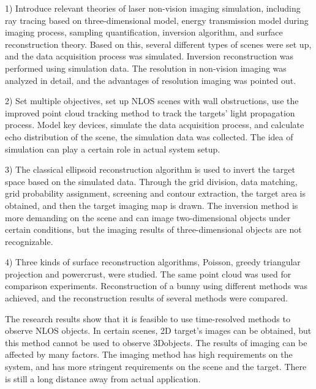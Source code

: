 1) Introduce relevant theories of laser non-vision imaging simulation, including ray tracing based on three-dimensional model, energy transmission model during imaging process, sampling quantification, inversion algorithm, and surface reconstruction theory.
 Based on this, several different types of scenes were set up, and the data acquisition process was simulated.
 Inversion reconstruction was performed using simulation data.
 The resolution in non-vision imaging was analyzed in detail, and the advantages of resolution imaging was pointed out.

2) Set multiple objectives, set up NLOS scenes with wall obstructions, use the improved point cloud tracking method to track the targets’ light propagation process.
 Model key devices, simulate the data acquisition process, and calculate echo distribution of the scene, the simulation data was collected.
 The idea of simulation can play a certain role in actual system setup.

3) The classical ellipsoid reconstruction algorithm is used to invert the target space based on the simulated data.
 Through the grid division, data matching, grid probability assignment, screening and contour extraction, the target area is obtained, and then the target imaging map is drawn.
 The inversion method is more demanding on the scene and can image two-dimensional objects under certain conditions, but the imaging results of three-dimensional objects are not recognizable.

4) Three kinds of surface reconstruction algorithms, Poisson, greedy triangular projection and powercrust, were studied.
 The same point cloud was used for comparison experiments.
 Reconstruction of a bunny using different methods was achieved, and the reconstruction results of several methods were compared.

The research results show that it is feasible to use time-resolved methods to observe NLOS objects.
 In certain scenes, 2D target’s images can be obtained, but this method cannot be used to observe 3Dobjects.
 The results of imaging can be affected by many factors.
 The imaging method has high requirements on the system, and has more stringent requirements on the scene and the target.
 There is still a long distance away from actual application.



